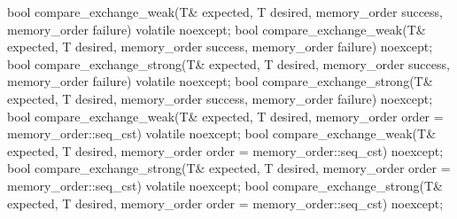 %
%
%
%
%
%
%
%
%
%
%
%
\begin{itemdecl}
bool compare_exchange_weak(T& expected, T desired,
                           memory_order success, memory_order failure) volatile noexcept;
bool compare_exchange_weak(T& expected, T desired,
                           memory_order success, memory_order failure) noexcept;
bool compare_exchange_strong(T& expected, T desired,
                             memory_order success, memory_order failure) volatile noexcept;
bool compare_exchange_strong(T& expected, T desired,
                             memory_order success, memory_order failure) noexcept;
bool compare_exchange_weak(T& expected, T desired,
                           memory_order order = memory_order::seq_cst) volatile noexcept;
bool compare_exchange_weak(T& expected, T desired,
                           memory_order order = memory_order::seq_cst) noexcept;
bool compare_exchange_strong(T& expected, T desired,
                             memory_order order = memory_order::seq_cst) volatile noexcept;
bool compare_exchange_strong(T& expected, T desired,
                             memory_order order = memory_order::seq_cst) noexcept;
\end{itemdecl}

